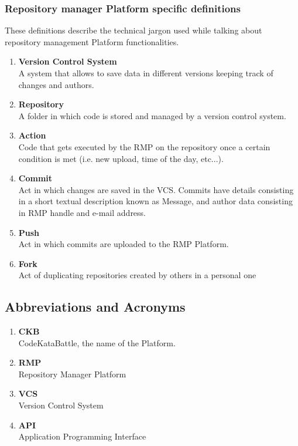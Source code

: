 \subsubsection[short]{Repository manager Platform specific definitions}
These definitions describe the technical jargon used while talking about repository management Platform functionalities.
\begin{enumerate}[label=$\bullet$]
    \item \textbf{Version Control System}\\A system that allows to save data in different versions keeping track of changes and authors.
    \item \textbf{Repository}\\A folder in which code is stored and managed by a version control system.
    \item \textbf{Action}\\Code that gets executed by the RMP on the repository once a certain condition is met (i.e. new upload, time of the day, etc...).
    \item \textbf{Commit}\\Act in which changes are saved in the VCS. Commits have details consisting in a short textual description known as Message, and author data consisting in RMP handle and e-mail address.
    \item \textbf{Push}\\Act in which commits are uploaded to the RMP Platform.
    \item \textbf{Fork}\\Act of duplicating repositories created by others in a personal one
\end{enumerate}
\subsection{Abbreviations and Acronyms}
\begin{enumerate}[label=$\bullet$]
    \item \textbf{CKB}\\CodeKataBattle, the name of the Platform.
    \item \textbf{RMP}\\Repository Manager Platform
    \item \textbf{VCS}\\Version Control System
    \item \textbf{API}\\Application Programming Interface
\end{enumerate}

